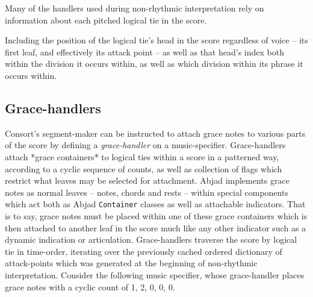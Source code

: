 Many of the handlers used during non-rhythmic interpretation rely on
information about each pitched logical tie in the score.

Including the position of the logical tie's head in the score regardless of
voice -- its first leaf, and effectively its attack point -- as well as that
head's index both within the division it occurs within, as well as which
division within its phrase it occurs within.

\subsection{Grace-handlers}
\label{ssec:grace-handlers}

Consort's segment-maker can be instructed to attach grace notes to various
parts of the score by defining a \emph{grace-handler} on a music-specifier.
Grace-handlers attach *grace containers* to logical ties within a score in a
patterned way, according to a cyclic sequence of counts, as well as collection
of flags which restrict what leaves may be selected for attachment.
Abjad implements grace notes as normal leaves -- notes, chords and rests --
within special components which act both as Abjad \texttt{Container} classes as
well as attachable indicators. That is to say, grace notes must be placed
within one of these grace containers which is then attached to another leaf in
the score much like any other indicator such as a dynamic indication or
articulation. Grace-handlers traverse the score by logical tie in time-order,
iterating over the previously cached ordered dictionary of attack-points which
was generated at the beginning of non-rhythmic interpretation. Consider the
following music specifier, whose grace-handler places grace notes with a cyclic
count of 1, 2, 0, 0, 0.

\begin{comment}
<abjad>[stylesheet=../consort.ily]
music_specifier = consort.MusicSpecifier(
    grace_handler=consort.GraceHandler(
        counts=(1, 2, 0, 0, 0),
        ),
    rhythm_maker=rhythmmakertools.TaleaRhythmMaker(
        extra_counts_per_division=(0, 1),
        talea=rhythmmakertools.Talea([1, 2, 3, 1, 4], 16),
        ),
    )
timespan_maker = consort.TaleaTimespanMaker(
    initial_silence_talea=rhythmmakertools.Talea([0, 1], 4),
    playing_groupings=(1, 2, 2),
    playing_talea=rhythmmakertools.Talea([2, 3], 8),
    silence_talea=rhythmmakertools.Talea([1, 2, 3, 4], 8),
    )
music_setting = consort.MusicSetting(
    timespan_maker=timespan_maker,
    v1=music_specifier,
    v2=music_specifier,
    )
segment_maker = consort.SegmentMaker(
    desired_duration_in_seconds=8,
    discard_final_silence=True,
    permitted_time_signatures=[(2, 4), (5, 16), (3, 4)],
    score_template=templatetools.GroupedRhythmicStavesScoreTemplate(
        staff_count=2,
        with_clefs=True,
        ),
    settings=[music_setting],
    tempo=indicatortools.Tempo((1, 4), 72),
    )
show(segment_maker, verbose=False)
</abjad>
\end{comment}

